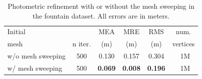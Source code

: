 \begin{table}[t]
\caption{Photometric refinement with or without the mesh sweeping  in the fountain dataset. All errors are in meters.}
\label{tab:resFountPhoto}
\setlength{\tabcolsep}{4px}
\normalsize
\centering
\begin{tabular}{lccccc}
\toprule 
Initial & & MEA & MRE & RMS & num. \\
mesh & n iter. & (m) & (m) & (m) & vertices \\
\midrule
w/o mesh sweeping &500& 0.130 & 0.157 & 0.304 & ~1M\\
w/ mesh sweeping &500& \textbf{0.069} & \textbf{0.008} & \textbf{0.196} & ~1M\\
\end{tabular}
\end{table}


% 
% 
% 
% 

